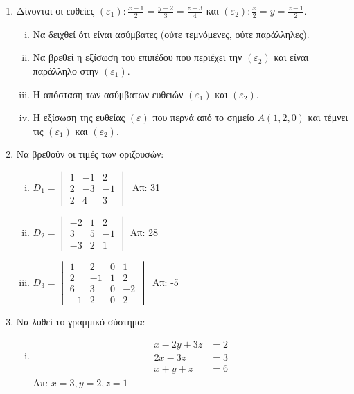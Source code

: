 \documentclass[a4paper,12pt]{article}
\begin{document}
\begin{enumerate}
\item Δίνονται οι ευθείες $(\varepsilon_1):\frac{x-1}{2}=\frac{y-2}{3}=\frac{z-3}{4}$ και $(\varepsilon_2):\frac{x}{2}=y=\frac{z-1}{2}$.
\begin{enumerate}[i)]
\item Να δειχθεί ότι είναι ασύμβατες (ούτε τεμνόμενες, ούτε παράλληλες).
\item Να βρεθεί η εξίσωση του επιπέδου που περιέχει την $(\varepsilon_2)$ και είναι παράλληλο στην $(\varepsilon_1)$.
\item Η απόσταση των ασύμβατων ευθειών $(\varepsilon_1)$ και $(\varepsilon_2)$. 
\item Η εξίσωση της ευθείας $(\varepsilon)$ που περνά από το σημείο $A(1,2,0)$ και τέμνει τις $(\varepsilon_1)$ και $(\varepsilon_2)$. 
\end{enumerate}

\item Να βρεθούν οι τιμές των οριζουσών:

\begin{enumerate}[i)]
\item 
\(
D_1=\begin{vmatrix}
1 & -1 & 2 \\
2 & -3 & -1 \\
2 & 4 & 3
\end{vmatrix}\
\)  \hfill Απ: 31

\item 
\(
D_2=\begin{vmatrix}
-2 & 1 & 2 \\
3 & 5 & -1 \\
-3 & 2 & 1
\end{vmatrix}
\)  \hfill Απ: 28

\item 
\(
D_3=\begin{vmatrix}
1 & 2 & 0 & 1 \\
2 & -1 & 1 & 2 \\
6 & 3 & 0 & -2 \\
-1 & 2 & 0 & 2
\end{vmatrix}\
\) \hfill Απ: -5
\end{enumerate}

\item Να λυθεί το γραμμικό σύστημα:

\begin{enumerate}[i)]
\item 
\begin{align*}
x-2y+3z&=2\\
2x-3z&=3 \\
x+y+z&=6 
\end{align*} Απ: $x=3, y=2, z=1$



\end{enumerate}
\end{enumerate}
\end{document}
